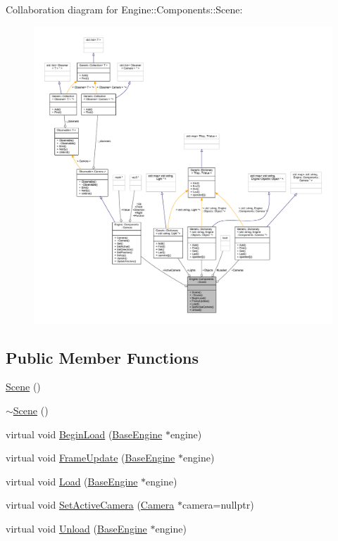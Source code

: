 Collaboration diagram for Engine\+:\+:Components\+:\+:Scene\+:
\nopagebreak
\begin{figure}[H]
\begin{center}
\leavevmode
\includegraphics[width=350pt]{classEngine_1_1Components_1_1Scene__coll__graph}
\end{center}
\end{figure}
\subsection*{Public Member Functions}
\begin{DoxyCompactItemize}
\item 
\mbox{\hyperlink{classEngine_1_1Components_1_1Scene_a64255073fa1568920613cdc10472c335}{Scene}} ()
\item 
\mbox{\hyperlink{classEngine_1_1Components_1_1Scene_a418538cc49eced3ac4901a4e31797594}{$\sim$\+Scene}} ()
\item 
virtual void \mbox{\hyperlink{classEngine_1_1Components_1_1Scene_af18bd334fe66952b8d79b8e9e99ab2d8}{Begin\+Load}} (\mbox{\hyperlink{classEngine_1_1BaseEngine}{Base\+Engine}} $\ast$engine)
\item 
virtual void \mbox{\hyperlink{classEngine_1_1Components_1_1Scene_abd8fcdcac52dbce6a0a18de3860ab087}{Frame\+Update}} (\mbox{\hyperlink{classEngine_1_1BaseEngine}{Base\+Engine}} $\ast$engine)
\item 
virtual void \mbox{\hyperlink{classEngine_1_1Components_1_1Scene_a23c5b23e66646443670a487e7c016e73}{Load}} (\mbox{\hyperlink{classEngine_1_1BaseEngine}{Base\+Engine}} $\ast$engine)
\item 
virtual void \mbox{\hyperlink{classEngine_1_1Components_1_1Scene_a936218df56c481f3aa12d684cee038f3}{Set\+Active\+Camera}} (\mbox{\hyperlink{classEngine_1_1Components_1_1Camera}{Camera}} $\ast$camera=nullptr)
\item 
virtual void \mbox{\hyperlink{classEngine_1_1Components_1_1Scene_a064ce89da5daa483369c3253f04c9d21}{Unload}} (\mbox{\hyperlink{classEngine_1_1BaseEngine}{Base\+Engine}} $\ast$engine)
\end{DoxyCompactItemize}
